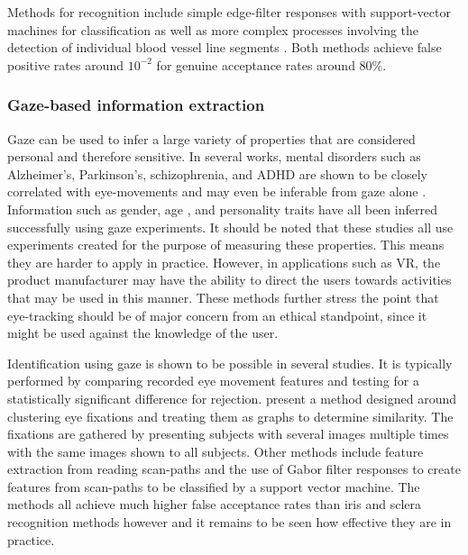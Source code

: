 Methods for recognition include simple edge-filter responses with support-vector machines for classification \parencite{das2013sclera} as well as more complex processes involving the detection of individual blood vessel line segments \parencite{zhou2011new}. Both methods achieve false positive rates around $10^{-2}$ for genuine acceptance rates around $80\%$.


\subsubsection{Gaze-based information extraction}
Gaze can be used to infer a large variety of properties that are considered personal and therefore sensitive. In several works, mental disorders such as Alzheimer's, Parkinson's, schizophrenia, and ADHD are shown to be closely correlated with eye-movements and may even be inferable from gaze alone \parencite{hutton1984eye, jayanthi2010automatic, holzman1974eye, galgani2009automatic}. Information such as gender, age \parencite{kuechenmeister1977eye}, and personality traits \parencite{hoppe2018eye} have all been inferred successfully using gaze experiments. It should be noted that these studies all use experiments created for the purpose of measuring these properties. This means they are harder to apply in practice. However, in applications such as VR, the product manufacturer may have the ability to direct the users towards activities that may be used in this manner. These methods further stress the point that eye-tracking should be of major concern from an ethical standpoint, since it might be used against the knowledge of the user. 

Identification using gaze is shown to be possible in several studies. It is typically performed by comparing recorded eye movement features and testing for a statistically significant difference for rejection. \cite{rigas2012biometric} present a method designed around clustering eye fixations and treating them as graphs to determine similarity. The fixations are gathered by presenting subjects with several images multiple times with the same images shown to all subjects. Other methods include feature extraction from reading scan-paths \parencite{holland2011biometric, bednarik2005eye} and the use of Gabor filter responses to create features from scan-paths to be classified by a support vector machine\parencite{li2018biometric}. The methods all achieve much higher false acceptance rates than iris and sclera recognition methods however and it remains to be seen how effective they are in practice.




